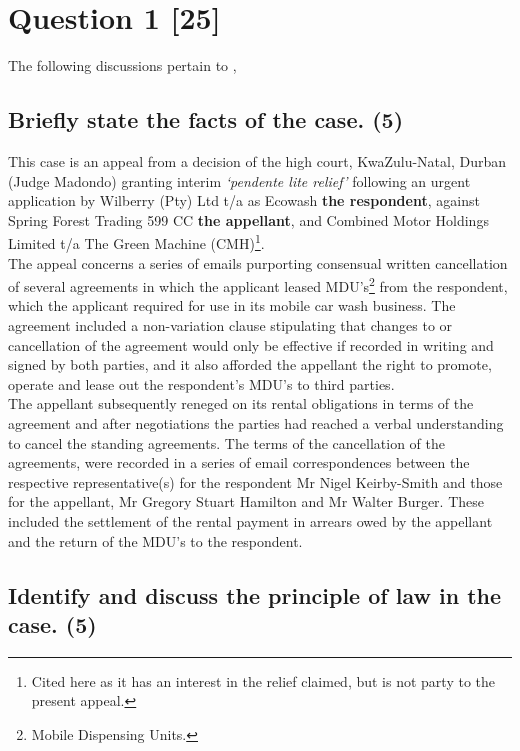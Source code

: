 \documentclass[11pt]{article}
\begin{document}

\section{Question 1 [25]}
\label{sec:orga74728f}

The following discussions pertain to 
\cite{Cachalia15_spring_forest_v_wilberry},

\subsection{Briefly state the facts of the case. (5)}
\label{sec:org785f689}

This case is an appeal from a decision of the high court, KwaZulu-Natal, Durban
(Judge Madondo) granting interim \emph{`pendente lite relief'} following an urgent
application by Wilberry (Pty) Ltd t/a as Ecowash \textbf{the respondent}, against Spring
Forest Trading 599 CC \textbf{the appellant}, and Combined Motor Holdings Limited t/a
The Green Machine (CMH)\footnote{Cited here as it has an interest in the relief
claimed, but is not party to the present appeal.}.\\

The appeal concerns a series of emails purporting consensual written
cancellation of several agreements in which the applicant leased
MDU's\footnote{Mobile Dispensing Units.} from the respondent, which the applicant
required for use in its mobile car wash business. The agreement included a
non-variation clause stipulating that changes to or cancellation of the
agreement would only be effective if recorded in writing and signed by both
parties, and it also afforded the appellant the right to promote, operate and lease out
the respondent's MDU's to third parties.\\

The appellant subsequently reneged on its rental obligations in terms of the
agreement and after negotiations the parties had reached a verbal understanding
to cancel the standing agreements. The terms of the cancellation of the
agreements, were recorded in a series of email correspondences between the
respective representative(s) for the respondent Mr Nigel Keirby-Smith and those
for the appellant, Mr Gregory Stuart Hamilton and Mr Walter Burger. These
included the settlement of the rental payment in arrears owed by the appellant
and the return of the MDU's to the respondent.

\subsection{Identify and discuss the principle of law in the case. (5)}
\label{sec:orgb7b1d14}
\end{document}
